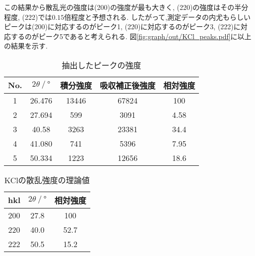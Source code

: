 この結果から散乱光の強度は(200)の強度が最も大きく, (220)の強度はその半分程度, (222)では$0.15$倍程度と予想される.
したがって,測定データの内尤もらしいピークは(200)に対応するのがピーク1,
(220)に対応するのがピーク3,
(222)に対応するのがピーク5であると考えられる.
図\ref{fig:graph/out/KCl_peaks.pdf}に以上の結果を示す.
\begin{table}[h]
\caption{抽出したピークの強度}
\label{tab:extract_peak_i}
\centering
\begin{tabular}{ccccc}
\hline
No.&$2\theta\ /\ \si{\degree}$&積分強度&吸収補正後強度&相対強度\\
\hline \hline
1&26.476& 13446 & 67824 & 100   \\
2&27.694& 599   & 3091  & 4.58  \\
3&40.58 & 3263  & 23381 & 34.4  \\
4&41.080& 741   & 5396  & 7.95  \\
5&50.334& 1223  & 12656 & 18.6  \\
\hline
\end{tabular}
\end{table}
\begin{table}[h]
\caption{KClの散乱強度の理論値}
\label{tab:KCl_i_riron}
\centering
\begin{tabular}{ccc}
\hline
hkl&$2\theta\ /\ \si{\degree}$&相対強度\\
\hline \hline
200&27.8&100\\
220&40.0&52.7\\
222&50.5&15.2\\
\hline
\end{tabular}
\end{table}
